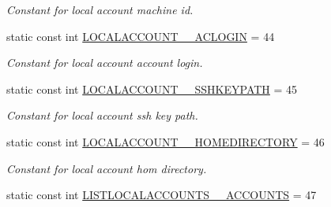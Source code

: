\begin{DoxyCompactItemize}
\begin{DoxyCompactList}\small\item\em Constant for local account machine id. \item\end{DoxyCompactList}\item 
\hypertarget{classUMS__Data_1_1UMS__DataPackage_a9a3ffade482de9adba5230d1a0c78b0b}{
static const int \hyperlink{classUMS__Data_1_1UMS__DataPackage_a9a3ffade482de9adba5230d1a0c78b0b}{LOCALACCOUNT\_\-\_\-ACLOGIN} = 44}
\label{classUMS__Data_1_1UMS__DataPackage_a9a3ffade482de9adba5230d1a0c78b0b}

\begin{DoxyCompactList}\small\item\em Constant for local account account login. \item\end{DoxyCompactList}\item 
\hypertarget{classUMS__Data_1_1UMS__DataPackage_a28056d0cb614560b49870784199c2f2b}{
static const int \hyperlink{classUMS__Data_1_1UMS__DataPackage_a28056d0cb614560b49870784199c2f2b}{LOCALACCOUNT\_\-\_\-SSHKEYPATH} = 45}
\label{classUMS__Data_1_1UMS__DataPackage_a28056d0cb614560b49870784199c2f2b}

\begin{DoxyCompactList}\small\item\em Constant for local account ssh key path. \item\end{DoxyCompactList}\item 
\hypertarget{classUMS__Data_1_1UMS__DataPackage_a58a65af3d275e9d2e8be808088eead98}{
static const int \hyperlink{classUMS__Data_1_1UMS__DataPackage_a58a65af3d275e9d2e8be808088eead98}{LOCALACCOUNT\_\-\_\-HOMEDIRECTORY} = 46}
\label{classUMS__Data_1_1UMS__DataPackage_a58a65af3d275e9d2e8be808088eead98}

\begin{DoxyCompactList}\small\item\em Constant for local account hom directory. \item\end{DoxyCompactList}\item 
\hypertarget{classUMS__Data_1_1UMS__DataPackage_ac40a6344421ebafcf61f1131a3f3fe10}{
static const int \hyperlink{classUMS__Data_1_1UMS__DataPackage_ac40a6344421ebafcf61f1131a3f3fe10}{LISTLOCALACCOUNTS\_\-\_\-ACCOUNTS} = 47}
\label{classUMS__Data_1_1UMS__DataPackage_ac40a6344421ebafcf61f1131a3f3fe10}


\end{DoxyCompactItemize}

